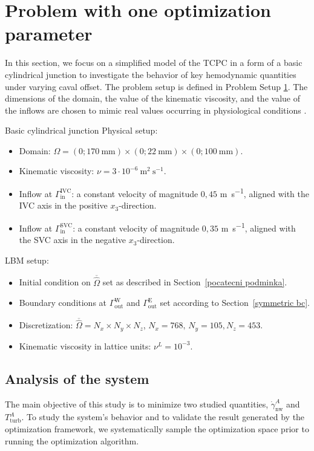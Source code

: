 \section{Problem with one optimization parameter}\label{optim1}
In this section, we focus on a simplified model of the TCPC in a form of a basic cylindrical junction to investigate the behavior of key hemodynamic quantities under varying caval offset. The problem setup is defined in Problem Setup \hyperlink{page.48}{1}. The dimensions of the domain, the value of the kinematic viscosity, and the value of the inflows are chosen to mimic real values occurring in physiological conditions \cite{Rijnberg2018}.

\vspace{2mm}
\begin{problem}{Basic cylindrical junction}
	\vspace{2mm}
	Physical setup:
	\begin{itemize}
		\item Domain: $ \Omega=(0 ; 170 \mathrm{~mm}) \times(0 ; 22 \mathrm{~mm}) \times(0 ; 100 \mathrm{~mm})$.
		\item Kinematic viscosity: $ \nu=3 \cdot 10^{-6} \mathrm{~m}^{2} \mathrm{~s}^{-1}$.
		\item Inflow at $\Gamma^{\text{IVC}}_{\text{in}}$: a constant velocity of magnitude $0{,}45$ \si{m s^{-1}},  aligned with the IVC axis in the positive $x_3$-direction.
		\item Inflow at $\Gamma^{\text{SVC}}_{\text{in}}$: a constant velocity of magnitude $0{,}35$ \si{m s^{-1}}, aligned with the SVC axis in the negative $x_3$-direction.
	\end{itemize} 
	LBM setup:
	\begin{itemize}
		\item Initial condition on $ \overline{\hat{\Omega}} $ set as described in Section~\ref{pocatecni podminka}.
		\item Boundary conditions at $\Gamma^{\text{W}}_{\text{out}}$ and $\Gamma^{\text{E}}_{\text{out}}$ set according to Section~\ref{symmetric bc}.
		\item Discretization: $\overline{\hat{\Omega}} = N_{x} \times N_{y} \times N_{z}$, $N_{x} = 768, \, N_{y} = 105, N_{z} = 453$.
		\item Kinematic viscosity in lattice units: $\nu^{L} = 10^{-3} $.
	\end{itemize}
	
\end{problem}

\subsection{Analysis of the system}
The main objective of this study is to minimize two studied quantities, $\dot{\gamma}^{A}_{\mathrm{nw}}$ and $T^{A}_{\mathrm{turb}}$. To study the system's behavior and to validate the result generated by the optimization framework, we systematically sample the optimization space prior to running the optimization algorithm.

